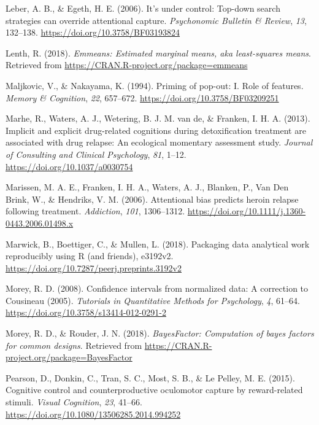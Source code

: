 \documentclass[man, a4paper, noextraspace, 11pt,floatsintext]{apa6}
\begin{document}
\hypertarget{ref-Leber2006}{}
Leber, A. B., \& Egeth, H. E. (2006). It's under control: Top-down
search strategies can override attentional capture. \emph{Psychonomic
Bulletin \& Review}, \emph{13}, 132--138.
\url{https://doi.org/10.3758/BF03193824}

\hypertarget{ref-R-emmeans}{}
Lenth, R. (2018). \emph{Emmeans: Estimated marginal means, aka
least-squares means}. Retrieved from
\url{https://CRAN.R-project.org/package=emmeans}

\hypertarget{ref-Maljkovic1994}{}
Maljkovic, V., \& Nakayama, K. (1994). Priming of pop-out: I. Role of
features. \emph{Memory \& Cognition}, \emph{22}, 657--672.
\url{https://doi.org/10.3758/BF03209251}

\hypertarget{ref-Marhe2013}{}
Marhe, R., Waters, A. J., Wetering, B. J. M. van de, \& Franken, I. H.
A. (2013). Implicit and explicit drug-related cognitions during
detoxification treatment are associated with drug relapse: An ecological
momentary assessment study. \emph{Journal of Consulting and Clinical
Psychology}, \emph{81}, 1--12. \url{https://doi.org/10.1037/a0030754}

\hypertarget{ref-Marissen2006}{}
Marissen, M. A. E., Franken, I. H. A., Waters, A. J., Blanken, P., Van
Den Brink, W., \& Hendriks, V. M. (2006). Attentional bias predicts
heroin relapse following treatment. \emph{Addiction}, \emph{101},
1306--1312. \url{https://doi.org/10.1111/j.1360-0443.2006.01498.x}

\hypertarget{ref-marwick2018}{}
Marwick, B., Boettiger, C., \& Mullen, L. (2018). Packaging data
analytical work reproducibly using R (and friends), e3192v2.
\url{https://doi.org/10.7287/peerj.preprints.3192v2}

\hypertarget{ref-Morey2008}{}
Morey, R. D. (2008). Confidence intervals from normalized data: A
correction to Cousineau (2005). \emph{Tutorials in Quantitative Methods
for Psychology}, \emph{4}, 61--64.
\url{https://doi.org/10.3758/s13414-012-0291-2}

\hypertarget{ref-R-BayesFactor}{}
Morey, R. D., \& Rouder, J. N. (2018). \emph{BayesFactor: Computation of
bayes factors for common designs}. Retrieved from
\url{https://CRAN.R-project.org/package=BayesFactor}

\hypertarget{ref-Pearson2015}{}
Pearson, D., Donkin, C., Tran, S. C., Most, S. B., \& Le Pelley, M. E.
(2015). Cognitive control and counterproductive oculomotor capture by
reward-related stimuli. \emph{Visual Cognition}, \emph{23}, 41--66.
\url{https://doi.org/10.1080/13506285.2014.994252}
\end{document}
